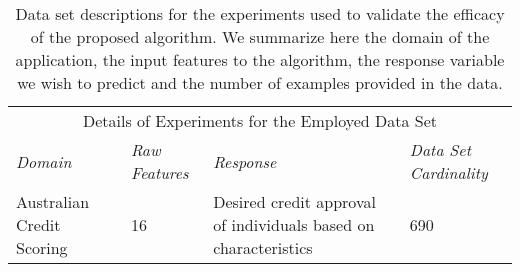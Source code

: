 \begin{table}[H]
    \centering
    \scriptsize
    \begin{tabular}{|p{3cm}|p{3cm}|p{4cm}|p{3cm}|}
      \hline
      \hline
      \multicolumn{4}{c}{Details of Experiments for the Employed Data Set}\\
      \cline{1-4}
      \emph{Domain} & \emph{Raw Features} & \emph{Response} & \emph{Data Set Cardinality}\\
      \hline
      Australian Credit Scoring & 16 & Desired credit approval of individuals based on characteristics & 690\\\hline
    \end{tabular}
    \caption{\small Data set descriptions for the experiments used to validate the efficacy of the proposed algorithm. We summarize here the domain of the application, the input features to the algorithm, the response variable we wish to predict and the number of examples provided in the data.}
  \end{table}